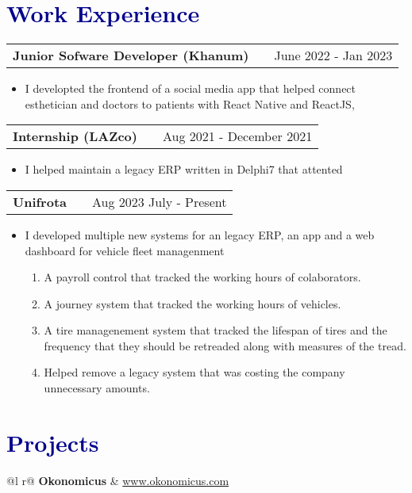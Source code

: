 \documentclass[a4paper,12pt]{article}
\makeatletter
\newenvironment{joblong}[2]
    {
    \begin{tabularx}{\linewidth}{@{}l X r@{}}
    \textbf{#1} & \hfill &  #2 \\[3.75pt]
    \end{tabularx}
    \begin{minipage}[t]{\linewidth}
    \begin{itemize}[nosep,after=\strut, leftmargin=1em, itemsep=3pt,label=--]
    }
    {
    \end{itemize}
    \end{minipage}    
    }
\makeatother
\begin{document}
\section{\textcolor{darkblue}{\textbf{Work Experience}}}

\begin{joblong}{Junior Sofware Developer (Khanum)}{June 2022 - Jan 2023}
\item I developted the frontend of a social media app that helped connect esthetician and doctors
to patients with React Native and ReactJS,
\end{joblong}

\begin{joblong}{Internship (LAZco)}{Aug 2021 - December 2021}
\item I helped maintain a legacy ERP written in Delphi7 that attented 
	
\end{joblong}

\begin{joblong}{Unifrota}{Aug 2023 July - Present}
\item I developed multiple new systems for an legacy ERP, an app and a web dashboard for vehicle fleet managenment 
	\begin{enumerate}
		\item A payroll control that tracked the working hours of colaborators.
		\item A journey system that tracked the working hours of vehicles.
		\item A tire managenement system that tracked the lifespan of tires and the frequency that they should be retreaded along with measures of the tread.
		\item  Helped remove a legacy system that was costing the company unnecessary amounts.
	\end{enumerate}
	
\end{joblong}


\section{\textcolor{darkblue}{\textbf{ Projects }}}


\begin{tabularx}{\linewidth}{ @{}l r@{} }
\textbf{Okonomicus} & \hfill \href{https://some-link.com}{www.okonomicus.com} \\[3.75pt]
  \\
\end{tabularx}

\vfill
{}
\end{document}
